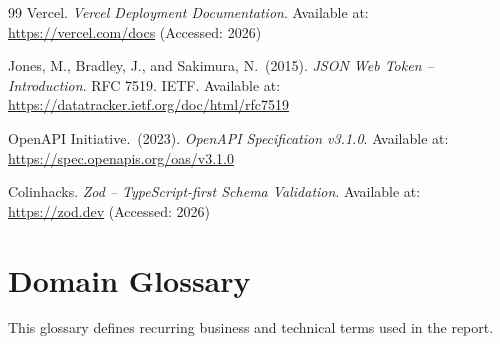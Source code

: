 \documentclass[12pt,a4paper]{report}
\begin{document}
\begin{thebibliography}{99}
    Vercel.
    \textit{Vercel Deployment Documentation}.
    Available at: \url{https://vercel.com/docs}
    (Accessed: 2026)

    Jones, M., Bradley, J., and Sakimura, N.\ (2015).
    \textit{JSON Web Token -- Introduction}.
    RFC 7519. IETF.
    Available at: \url{https://datatracker.ietf.org/doc/html/rfc7519}

    OpenAPI Initiative.\ (2023).
    \textit{OpenAPI Specification v3.1.0}.
    Available at: \url{https://spec.openapis.org/oas/v3.1.0}

    Colinhacks.
    \textit{Zod -- TypeScript-first Schema Validation}.
    Available at: \url{https://zod.dev}
    (Accessed: 2026)

\end{thebibliography}

\appendix

\chapter{Domain Glossary}
\label{app:glossary}

This glossary defines recurring business and technical terms used in the report.
\end{document}
